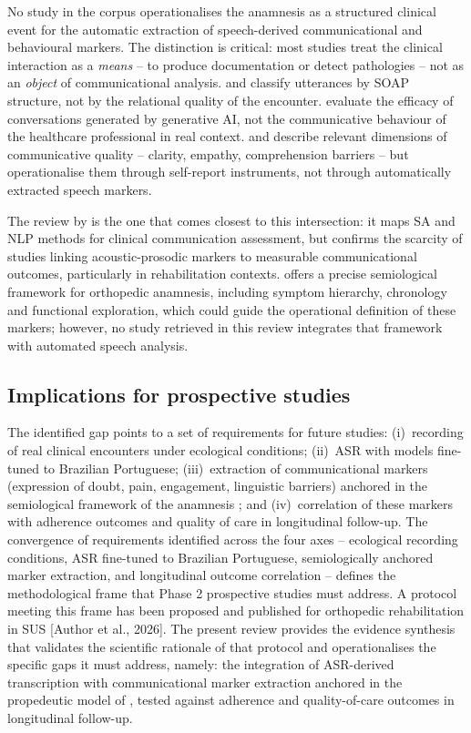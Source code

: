 \documentclass[review,12pt]{elsarticle}
\begin{document}
No study in the corpus operationalises the anamnesis as a structured clinical
event for the automatic extraction of speech-derived communicational and
behavioural markers.
The distinction is critical: most studies treat the clinical interaction as a
\emph{means} -- to produce documentation or detect pathologies -- not as an
\emph{object} of communicational analysis.
\citet{Krishna2021} and
\citet{Schloss2020} classify utterances by SOAP structure, not by the
relational quality of the encounter.
\citet{Abbasian2024} evaluate the efficacy of conversations generated by
generative AI, not the communicative behaviour of the healthcare professional
in real context.
\citet{Shao2025} and \citet{McCabe2018} describe relevant dimensions of
communicative quality -- clarity, empathy, comprehension barriers -- but
operationalise them through self-report instruments, not through automatically
extracted speech markers.

The review by \citet{Albert2024} is the one that comes closest to this
intersection: it maps SA and NLP methods for clinical communication assessment,
but confirms the scarcity of studies linking acoustic-prosodic markers to
measurable communicational outcomes, particularly in rehabilitation contexts.
\citet{Porto2019} offers a precise semiological framework for orthopedic
anamnesis, including symptom hierarchy, chronology and functional exploration,
which could guide the operational definition of these markers; however, no
study retrieved in this review integrates that framework with automated
speech analysis.

\subsection*{Implications for prospective studies}

The identified gap points to a set of requirements for future studies:
(i)~recording of real clinical encounters under ecological conditions;
(ii)~ASR with models fine-tuned to Brazilian Portuguese;
(iii)~extraction of communicational markers (expression of doubt, pain,
engagement, linguistic barriers) anchored in the semiological framework of
the anamnesis \citep{Porto2019}; and
(iv)~correlation of these markers with adherence outcomes and quality of care
in longitudinal follow-up.
The convergence of requirements identified across the four axes --
ecological recording conditions, ASR fine-tuned to Brazilian Portuguese,
semiologically anchored marker extraction, and longitudinal outcome
correlation -- defines the methodological frame that Phase 2 prospective
studies must address. A protocol meeting this frame has been proposed and
published for orthopedic rehabilitation in SUS [Author et al., 2026]. The
present review provides the evidence synthesis that validates the
scientific rationale of that protocol and operationalises the specific
gaps it must address, namely: the integration of ASR-derived transcription
with communicational marker extraction anchored in the propedeutic model
of \citet{Porto2019}, tested against adherence and quality-of-care
outcomes in longitudinal follow-up.
\end{document}
